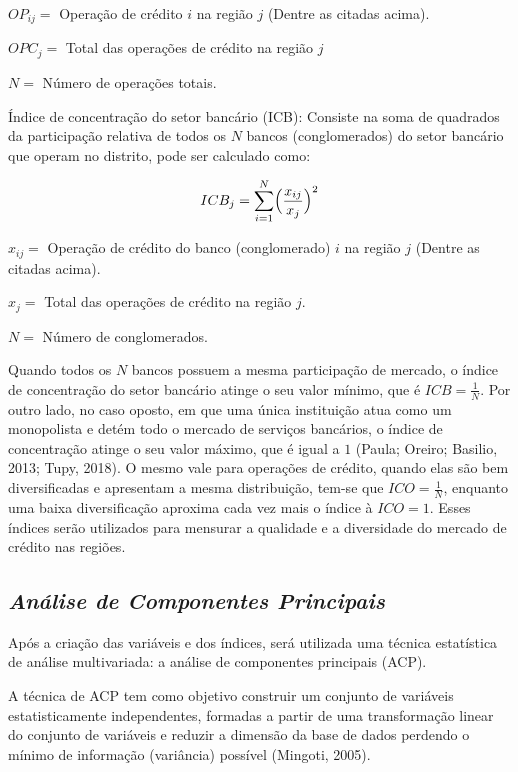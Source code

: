 \documentclass[a4paper,12pt]{article}
\begin{document}
\(OP_{ij} =\) Operação de crédito \(i\) na região \(j\) (Dentre as
citadas acima).

\(OPC_{j} =\) Total das operações de crédito na região \(j\)

\(N =\) Número de operações totais.

Índice de concentração do setor bancário (ICB): Consiste na soma de
quadrados da participação relativa de todos os \(N\) bancos
(conglomerados) do setor bancário que operam no distrito, pode ser
calculado como:

\begin{equation}
ICB_{j} = \sum_{i=1}^N \Bigl(\frac{x_{ij}}{x_{j}}\Bigr)^2
\end{equation}

\(x_{ij} =\) Operação de crédito do banco (conglomerado) \(i\) na região
\(j\) (Dentre as citadas acima).

\(x_{j} =\) Total das operações de crédito na região \(j\).

\(N =\) Número de conglomerados.

Quando todos os \(N\) bancos possuem a mesma participação de mercado, o
índice de concentração do setor bancário atinge o seu valor mínimo, que
é \(ICB = \frac{1}{N}\). Por outro lado, no caso oposto, em que uma
única instituição atua como um monopolista e detém todo o mercado de
serviços bancários, o índice de concentração atinge o seu valor máximo,
que é igual a \(1\) (Paula; Oreiro; Basilio, 2013; Tupy, 2018). O mesmo
vale para operações de crédito, quando elas são bem diversificadas e
apresentam a mesma distribuição, tem-se que \(ICO = \frac{1}{N}\),
enquanto uma baixa diversificação aproxima cada vez mais o índice à
\(ICO = 1\). Esses índices serão utilizados para mensurar a qualidade e
a diversidade do mercado de crédito nas regiões.

\hypertarget{anuxe1lise-de-componentes-principais}{%
\subsection{\texorpdfstring{\emph{Análise de Componentes
Principais}}{Análise de Componentes Principais}}\label{anuxe1lise-de-componentes-principais}}

Após a criação das variáveis e dos índices, será utilizada uma técnica
estatística de análise multivariada: a análise de componentes principais
(ACP).

A técnica de ACP tem como objetivo construir um conjunto de variáveis
estatisticamente independentes, formadas a partir de uma transformação
linear do conjunto de variáveis e reduzir a dimensão da base de dados
perdendo o mínimo de informação (variância) possível (Mingoti, 2005).
\end{document}
